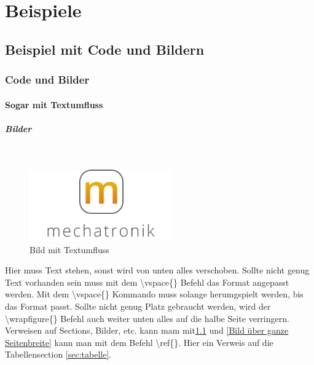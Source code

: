 \chapter{Beispiele}

\section{Beispiel mit Code und Bildern}
\label{sec:beispiel}

\subsection{Code und Bilder}
\label{sec:code-bild}

\subsubsection{Sogar mit Textumfluss}
\label{sec:floating-text}

\paragraph{Bilder}\mbox{}\\

\begin{figure}
\vspace{-30pt}
  \begin{center}
    \includegraphics[width=0.55\textwidth]{fig/logoMecha}
  \end{center}
  \caption{Bild mit Textumfluss}
  \label{Bild mit Textumfluss}
  \vspace{-10pt}
\end{figure}

Hier muss Text stehen, sonst wird von unten alles verschoben. Sollte nicht genug Text vorhanden sein muss mit dem \textbackslash{}vspace\{\} Befehl das Format angepasst werden. Mit dem \textbackslash{}vspace\{\} Kommando muss solange herumgspielt werden, bis das Format passt. Sollte nicht genug Platz gebraucht werden, wird der \textbackslash{}wrapfigure\{\} Befehl auch weiter unten alles auf die halbe Seite verringern. Verweisen auf Sections, Bilder, etc. kann mam mit\ref{Bild mit Textumfluss} und \ref{Bild über ganze Seitenbreite} kann man mit dem Befehl \textbackslash{}ref\{\}. Hier ein Verweis auf die Tabellensection \ref{sec:tabelle}.

